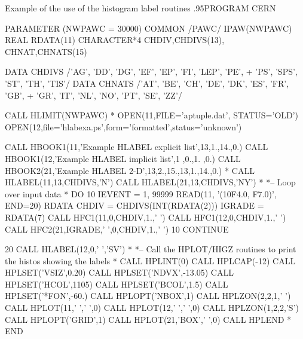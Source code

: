 \begin{XMPt}{Example of the use of the histogram label routines}
\baselineskip.95\baselineskip\relax      PROGRAM CERN

      PARAMETER (NWPAWC = 30000)
      COMMON /PAWC/ IPAW(NWPAWC)
      REAL        RDATA(11)
      CHARACTER*4 CHDIV,CHDIVS(13), CHNAT,CHNATS(15)

      DATA CHDIVS /'AG', 'DD', 'DG', 'EF', 'EP', 'FI', 'LEP', 'PE',
     +           'PS', 'SPS', 'ST', 'TH', 'TIS'/
      DATA CHNATS /'AT', 'BE', 'CH', 'DE', 'DK', 'ES', 'FR', 'GB',
     +           'GR', 'IT', 'NL', 'NO', 'PT', 'SE', 'ZZ'/

      CALL HLIMIT(NWPAWC)
*
      OPEN(11,FILE='aptuple.dat', STATUS='OLD')
      OPEN(12,file='hlabexa.ps',form='formatted',status='unknown')

      CALL HBOOK1(11,'Example HLABEL explicit list',13,1.,14.,0.)
      CALL HBOOK1(12,'Example HLABEL implicit list',1 ,0.,1. ,0.)
      CALL HBOOK2(21,'Example HLABEL 2-D',13,2.,15.,13,1.,14.,0.)
*
      CALL HLABEL(11,13,CHDIVS,'N')
      CALL HLABEL(21,13,CHDIVS,'NY')
*
*-- Loop over input data
*
      DO 10 IEVENT = 1, 99999
         READ(11, '(10F4.0, F7.0)', END=20) RDATA
         CHDIV    = CHDIVS(INT(RDATA(2)))
         IGRADE   = RDATA(7)
         CALL HFC1(11,0,CHDIV,1.,' ')
         CALL HFC1(12,0,CHDIV,1.,' ')
         CALL HFC2(21,IGRADE,' ',0,CHDIV,1.,' ')
   10 CONTINUE
      
   20 CALL HLABEL(12,0,' ','SV')  
*
*-- Call the HPLOT/HIGZ routines to print the histos showing the labels
*
      CALL HPLINT(0)
      CALL HPLCAP(-12)
      CALL HPLSET('VSIZ',0.20)
      CALL HPLSET('NDVX',-13.05)
      CALL HPLSET('HCOL',1105)
      CALL HPLSET('BCOL',1.5)
      CALL HPLSET('*FON',-60.)
      CALL HPLOPT('NBOX',1)
      CALL HPLZON(2,2,1,' ')
      CALL HPLOT(11,' ',' ',0)
      CALL HPLOT(12,' ',' ',0)
      CALL HPLZON(1,2,2,'S')  
      CALL HPLOPT('GRID',1)
      CALL HPLOT(21,'BOX',' ',0)
      CALL HPLEND
*
      END
\end{XMPt}

